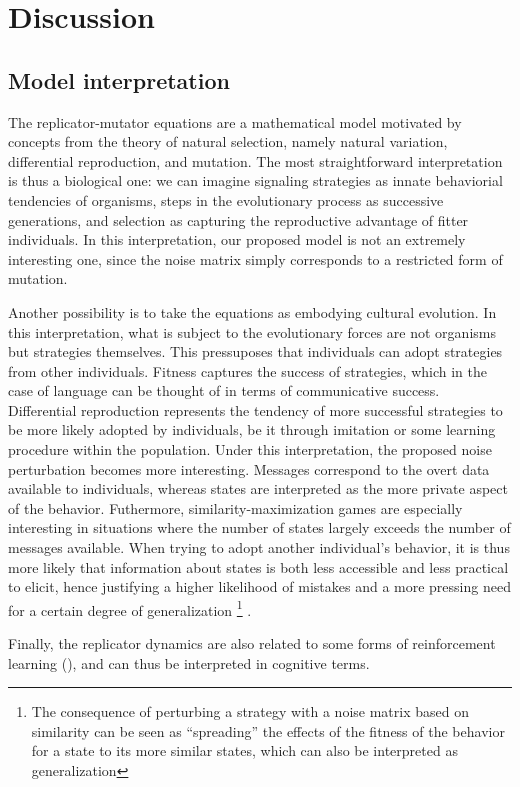 
\section{Discussion}
\label{sec:discussion}

\subsection{Model interpretation}
The replicator-mutator equations are a mathematical model motivated by concepts from the theory of natural selection, namely natural variation, differential reproduction, and mutation.
The most straightforward interpretation is thus a biological one: we can imagine signaling strategies as innate behaviorial tendencies of organisms, steps in the evolutionary process as successive generations, and selection as capturing the reproductive advantage of fitter individuals.
In this interpretation, our proposed model is not an extremely interesting one, since the noise matrix simply corresponds to a restricted form of mutation.

Another possibility is to take the equations as embodying cultural evolution.
In this interpretation, what is subject to the evolutionary forces are not organisms but strategies themselves.
This pressuposes that individuals can adopt strategies from other individuals.
Fitness captures the success of strategies, which in the case of language can be thought of in terms of communicative success.
Differential reproduction represents the tendency of more successful strategies to be more likely adopted by individuals, be it through imitation or some learning procedure within the population.
Under this interpretation, the proposed noise perturbation becomes more interesting.
Messages correspond to the overt data available to individuals, whereas states are interpreted as the more private aspect of the behavior.
Futhermore, similarity-maximization games are especially interesting in situations where the number of states largely exceeds the number of messages available.
When trying to adopt another individual's behavior, it is thus more likely that information about states is both less accessible and less practical to elicit, hence justifying a higher likelihood of mistakes and a more pressing need for a certain degree of generalization%
\footnote{The consequence of perturbing a strategy with a noise matrix based on similarity can be seen as ``spreading'' the effects of the fitness of the behavior for a state to its more similar states, which can also be interpreted as generalization}%
.

Finally, the replicator dynamics are also related to some forms of reinforcement learning (\cite{Borgers1997,Hopkins2005,Beggs2005}), and can thus be interpreted in cognitive terms.








